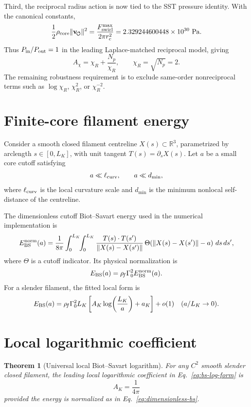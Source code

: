 \documentclass[11pt]{article}
\newcommand{\rhof}{\rho_{\!f}}
\newtheorem{theorem}{Theorem}
\begin{document}
Third, the reciprocal radius action is now tied to the SST pressure identity.
With the canonical constants,
\[
  \frac12\rho_{\rm core}
  \lVert\mathbf v_{\!\boldsymbol{\circlearrowleft}}\rVert^2
  =
  \frac{F_{\rm swirl}^{\max}}{2\pi r_c^2}
  =
  2.329244600448\times10^{30}\ {\rm Pa}.
\]
Thus \(P_{\rm in}/P_{\rm out}=1\) in the leading Laplace-matched reciprocal
model, giving
\[
  A_\chi=\chi_R+\frac{N_p}{\chi_R},
  \qquad
  \chi_R=\sqrt{N_p}=2.
\]
The remaining robustness requirement is to exclude same-order nonreciprocal
terms such as \(\log\chi_R\), \(\chi_R^2\), or \(\chi_R^{-2}\).

\section{Finite-core filament energy}

Consider a smooth closed filament centreline \(X(s)\subset\mathbb R^3\), parametrized by
arclength \(s\in[0,L_K]\), with unit tangent \(T(s)=\partial_s X(s)\).  Let \(a\) be a small
core cutoff satisfying
\[
  a\ll \ell_{\rm curv},\qquad a\ll d_{\min},
\]
where \(\ell_{\rm curv}\) is the local curvature scale and \(d_{\min}\) is the minimum
nonlocal self-distance of the centreline.

The dimensionless cutoff Biot--Savart energy used in the numerical implementation is
\begin{equation}
  E_{\rm BS}^{\rm norm}(a)
  =
  \frac{1}{8\pi}
  \int_{0}^{L_K}\!\!\int_{0}^{L_K}
  \frac{T(s)\cdot T(s')}{\lVert X(s)-X(s')\rVert}
  \,\Theta\!\left(\lVert X(s)-X(s')\rVert-a\right)\,ds\,ds',
  \label{eq:dimensionless-bs}
\end{equation}
where \(\Theta\) is a cutoff indicator.  Its physical normalization is
\begin{equation}
  E_{\rm BS}(a)
  =
  \rhof\Gamma_0^2
  E_{\rm BS}^{\rm norm}(a).
\end{equation}
For a slender filament, the fitted local form is
\begin{equation}
  E_{\rm BS}(a)
  =
  \rhof\Gamma_0^2 L_K
  \left[
  A_K\log\!\left(\frac{L_K}{a}\right)+a_K
  \right]
  +
  o(1)
  \quad(a/L_K\to0).
  \label{eq:bs-log-form}
\end{equation}

\section{Local logarithmic coefficient}
\label{sec:AK}

\begin{theorem}[Universal local Biot--Savart logarithm]
For any \(C^2\) smooth slender closed filament, the leading local logarithmic coefficient in
Eq.~\eqref{eq:bs-log-form} is
\[
  A_K=\frac{1}{4\pi}
\]
provided the energy is normalized as in Eq.~\eqref{eq:dimensionless-bs}.
\end{theorem}
\end{document}
